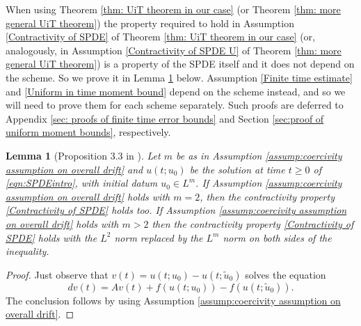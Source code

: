 \documentclass[reqno, 11pt]{amsart}
\theoremstyle{plain}
\newtheorem{lemma}[theorem]{Lemma}
\theoremstyle{definition}
\theoremstyle{remark}
\numberwithin{equation}{section}
\numberwithin{theorem}{section}
\begin{document}
{When  using Theorem \ref{thm: UiT theorem in our case} (or Theorem \ref{thm: more general UiT theorem}) 
  the property required to hold in Assumption  \ref{Contractivity of SPDE}  of Theorem \ref{thm: UiT theorem in our case}  (or, analogously, in Assumption \ref{Contractivity of SPDE U} of Theorem \ref{thm: more general UiT theorem}) is a property of the SPDE itself and it does not depend on the scheme. So we prove it in Lemma \ref{lemma:contractivity of SPDE} below. Assumption \ref{Finite time estimate} and \ref{Uniform in time moment bound} depend on the scheme instead, and so we will need to prove them for each scheme separately. Such proofs are deferred to  Appendix \ref{sec: proofs of finite time error bounds} and Section \ref{sec:proof of uniform moment bounds}, respectively.  


\begin{lemma}[Proposition 3.3 in \cite{brehier2022approximation}]\label{lemma:contractivity of SPDE}
    Let $m$ be as in Assumption \ref{assump:coercivity assumption on overall drift} and   $u(t;u_0)$ be the solution at time $t\geq 0$ of \eqref{eqn:SPDEintro}, with initial datum $u_0 \in L^m$. If Assumption \ref{assump:coercivity assumption on overall drift} holds with $m=2$, then the contractivity property \ref{Contractivity of SPDE} holds too.  If  Assumption \ref{assump:coercivity assumption on overall drift} holds with $m>2$ then the contractivity property \ref{Contractivity of SPDE} holds with the $L^2$ norm replaced by the $L^m$ norm on both sides of the inequality.
\end{lemma} 
\begin{proof}
    Just observe that $v(t) = u(t;u_0) - u(t; \tilde u_0)$ solves the equation 
    $$
    d v(t) = A v(t) + f(u(t; u_0)) - f(u(t; \tilde u_0)). 
    $$
    The conclusion follows by using Assumption  \ref{assump:coercivity assumption on overall drift}. 
\end{proof}

}
\end{document}
